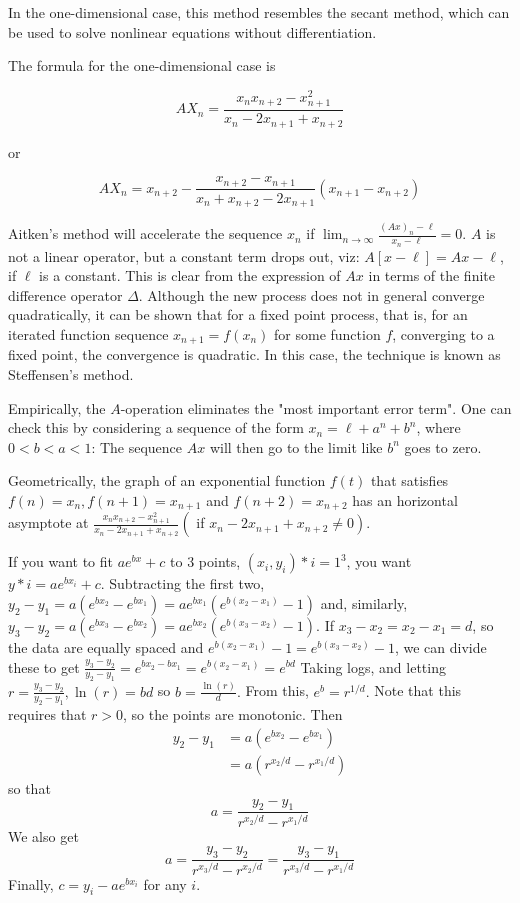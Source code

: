 In the one-dimensional case, this method resembles the secant method, which can be used to solve nonlinear equations without differentiation.

The formula for the one-dimensional case is

$$
AX_n = \frac{x_n x_{n+2} - x_{n+1}^2}{x_n-2x_{n+1}+ x_{n+2} }
$$

or

$$
AX_n = x_{n+2} - \frac{x_{n+2} - x_{n+1} }{x_n + x_{n+2} - 2 x_{n+1} }(x_{n+1}-x_{n+2})
$$

Aitken's method will accelerate the sequence $x_{n}$ if $\lim_{n \rightarrow \infty} \frac{(A x)_{n}-\ell}{x_{n}-\ell}=0$.
$A$ is not a linear operator, but a constant term drops out, viz: $A[x-\ell]=A x-\ell$, if $\ell$ is a constant. This is clear from the expression of $A x$ in terms of the finite difference operator $\Delta$.
Although the new process does not in general converge quadratically, it can be shown that for a fixed point process, that is, for an iterated function sequence $x_{n+1}=f\left(x_{n}\right)$ for some function $f$, converging to a fixed point, the convergence is quadratic. In this case, the technique is known as Steffensen's method.

Empirically, the $A$-operation eliminates the "most important error term". One can check this by considering a sequence of the form $x_{n}=\ell+a^{n}+b^{n}$, where $0<b<a<1$: The sequence $A x$ will then go to the limit like $b^{n}$ goes to zero.

Geometrically, the graph of an exponential function $f(t)$ that satisfies \(f(n)=x_{n}, f(n+1)=x_{n+1}\) and \(f(n+2)=x_{n+2}\) has an horizontal asymptote at \(\frac{x_{n} x_{n+2}-x_{n+1}^{2}}{x_{n}-2 x_{n+1}+x_{n+2}}\left(\right.\) if \(\left.x_{n}-2 x_{n+1}+x_{n+2} \neq 0\right)\).

If you want to fit \(a e^{b x}+c\) to 3 points, \(\left(x_{i}, y_{i}\right)*{i=1}^{3}\), you want \(y*{i}=a e^{b x_{i}}+c .\)
Subtracting the first two, \(y_{2}-y_{1}=a\left(e^{b x_{2}}-e^{b x_{1}}\right)=a e^{b x_{1}}\left(e^{b\left(x_{2}-x_{1}\right)}-1\right)\) and, similarly, \(y_{3}-y_{2}=a\left(e^{b x_{3}}-e^{b x_{2}}\right)=a e^{b x_{2}}\left(e^{b\left(x_{3}-x_{2}\right)}-1\right) .\)
If \(x_{3}-x_{2}=x_{2}-x_{1}=d\), so the data are equally spaced and \(e^{b\left(x_{2}-x_{1}\right)}-1=e^{b\left(x_{3}-x_{2}\right)}-1\), we can divide these to get
\(\frac{y_{3}-y_{2}}{y_{2}-y_{1}}=e^{b x_{2}-b x_{1}}=e^{b\left(x_{2}-x_{1}\right)}=e^{b d}\)
Taking logs, and letting \(r=\frac{y_{3}-y_{2}}{y_{2}-y_{1}}, \ln (r)=b d\) so \(b=\frac{\ln (r)}{d} .\) From this, \(e^{b}=r^{1 / d} .\)
Note that this requires that \(r>0\), so the points are monotonic.
Then
\[
\begin{aligned}
y_{2}-y_{1} &=a\left(e^{b x_{2}}-e^{b x_{1}}\right) \\
&=a\left(r^{x_{2} / d}-r^{x_{1} / d}\right)
\end{aligned}
\]
so that
\[
a=\frac{y_{2}-y_{1}}{r^{x_{2} / d}-r^{x_{1} / d}}
\]
We also get
\[
a=\frac{y_{3}-y_{2}}{r^{x_{3} / d}-r^{x_{2} / d}}=\frac{y_{3}-y_{1}}{r^{x_{3} / d}-r^{x_{1} / d}}
\]
Finally, \(c=y_{i}-a e^{b x_{i}}\) for any \(i\).

